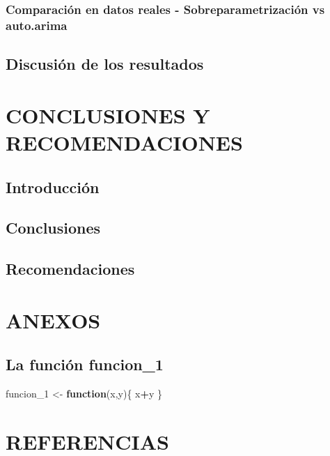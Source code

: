 \documentclass[
]{article}
\newenvironment{Shaded}{\begin{snugshade}}{\end{snugshade}}
\newcommand{\ControlFlowTok}[1]{\textcolor[rgb]{0.13,0.29,0.53}{\textbf{#1}}}
\newcommand{\DecValTok}[1]{\textcolor[rgb]{0.00,0.00,0.81}{#1}}
\newcommand{\NormalTok}[1]{#1}
\newcommand{\OperatorTok}[1]{\textcolor[rgb]{0.81,0.36,0.00}{\textbf{#1}}}
\newcommand{\StringTok}[1]{\textcolor[rgb]{0.31,0.60,0.02}{#1}}
\begin{document}
\subsubsection{Comparación en datos reales - Sobreparametrización vs auto.arima}

\subsection{Discusión de los resultados}

\newpage

\section{CONCLUSIONES Y RECOMENDACIONES}

\subsection{Introducción}

\subsection{Conclusiones}

\subsection{Recomendaciones}

\newpage

\section{ANEXOS}

\subsection{La función funcion\_1}

\label{funcion1}

\begin{Shaded}
\begin{Highlighting}[]
\NormalTok{funcion\_}\DecValTok{1}\NormalTok{ \textless{}{-}}\StringTok{ }\ControlFlowTok{function}\NormalTok{(x,y)\{}
\NormalTok{    x}\OperatorTok{+}\NormalTok{y}
\NormalTok{\}}
\end{Highlighting}
\end{Shaded}

\newpage

\section{REFERENCIAS}
\end{document}
